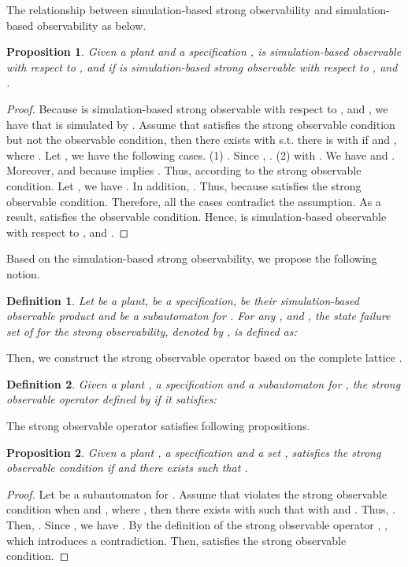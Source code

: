 \documentclass[12pt,draftcls,onecolumn]{IEEEtran}
\newtheorem{Proposition}{Proposition}
\newtheorem{Definition}{Definition}
\begin{document}
The relationship between simulation-based strong observability and
simulation-based observability as below.
\begin{Proposition}
Given a plant  and a
specification ,  is
simulation-based observable with respect to ,  and
 if  is simulation-based strong observable with respect to
,  and .
\end{Proposition}

\begin{proof}
Because  is simulation-based strong observable with respect to
,  and , we have that  is simulated by .
Assume that  satisfies the strong observable condition but not
the observable condition, then there exists  with
 s.t. there is  with  if  and ,
where . Let , we have the
following cases. (1) . Since , . (2) 
with . We have  and . Moreover,  and  because  implies . Thus,
 according to the strong
observable condition. Let , we
have . In addition, . Thus,
 because  satisfies the
strong observable condition. Therefore, all the cases contradict
the assumption. As a result,  satisfies the observable
condition. Hence,  is simulation-based observable with respect
to ,  and .
\end{proof}

Based on the simulation-based strong observability, we propose the
following notion.

\begin{Definition}
Let  be a plant,  be a specification,  be their simulation-based observable product and  be a subautomaton
for  . For any ,  and , the state failure set of
 for the strong observability, denoted by , is
defined as:

\end{Definition}

Then, we construct the strong observable operator based on the
complete lattice .
\begin{Definition}
Given a plant , a specification
 and a subautomaton  for , the strong observable operator  defined by  if
it satisfies:

\end{Definition}

The strong observable operator satisfies following propositions.

\begin{Proposition}\label{ns}
Given a plant , a specification
 and a set ,  satisfies the strong observable condition if  and there exists  such that .
\end{Proposition}


\begin{proof}
Let  be a
subautomaton for . Assume that  violates the strong
observable condition when  and , where , then there exists 
with  such that  with
 and . Thus, . Then, . Since , we have . By the definition of the strong observable
operator , , which
introduces a contradiction. Then,  satisfies the strong
observable condition.
\end{proof}
\end{document}
